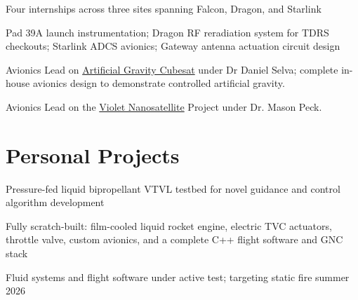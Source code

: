 \documentclass[]{deedy-resume-openfont}
\begin{document}
\begin{minipage}[t]{0.71\textwidth}
\vspace{\topsep}
\begin{tightemize}
\item Four internships across three sites spanning Falcon, Dragon, and Starlink
\item Pad 39A launch instrumentation; Dragon RF reradiation system for TDRS checkouts; Starlink ADCS avionics; Gateway antenna actuation circuit design
\end{tightemize}

\vspace{\topsep}

\begin{tightemize}
\item Avionics Lead on \href{https://blogs.cornell.edu/cugravity/}{Artificial Gravity Cubesat} under Dr Daniel Selva; complete in-house avionics design to demonstrate controlled artificial gravity.
\item Avionics Lead on the \href{https://cusat.cornell.edu/violet/}{Violet Nanosatellite} Project under Dr. Mason Peck.
\end{tightemize}


\section{\Large{Personal Projects}}
\begin{tightemize}
    \item Pressure-fed liquid bipropellant VTVL testbed for novel guidance and control algorithm development
    \item Fully scratch-built: film-cooled liquid rocket engine, electric TVC actuators, throttle valve, custom avionics, and a complete C++ flight software and GNC stack
    \item Fluid systems and flight software under active test; targeting static fire summer 2026
\end{tightemize}




\end{minipage}
\end{document}
